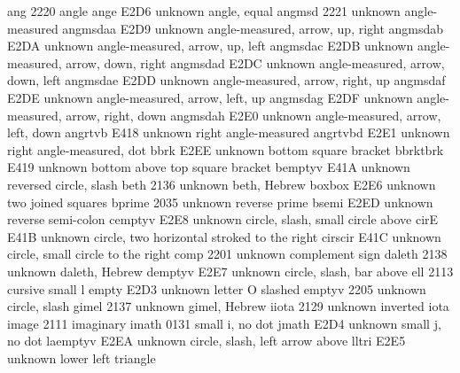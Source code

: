 %
%

 ang            2220 {\angle} angle
 ange           E2D6 {unknown} angle, equal
 angmsd         2221 {unknown} angle-measured
 angmsdaa       E2D9 {unknown} angle-measured, arrow, up, right
 angmsdab       E2DA {unknown} angle-measured, arrow, up, left
 angmsdac       E2DB {unknown} angle-measured, arrow, down, right
 angmsdad       E2DC {unknown} angle-measured, arrow, down, left
 angmsdae       E2DD {unknown} angle-measured, arrow, right, up
 angmsdaf       E2DE {unknown} angle-measured, arrow, left, up
 angmsdag       E2DF {unknown} angle-measured, arrow, right, down
 angmsdah       E2E0 {unknown} angle-measured, arrow, left, down
 angrtvb        E418 {unknown} right angle-measured
 angrtvbd       E2E1 {unknown} right angle-measured, dot
 bbrk           E2EE {unknown} bottom square bracket
 bbrktbrk       E419 {unknown} bottom above top square bracket
 bemptyv        E41A {unknown} reversed circle, slash
 beth           2136 {unknown} beth, Hebrew
 boxbox         E2E6 {unknown} two joined squares
 bprime         2035 {unknown} reverse prime
 bsemi          E2ED {unknown} reverse semi-colon
 cemptyv        E2E8 {unknown} circle, slash, small circle above
 cirE           E41B {unknown} circle, two horizontal stroked to the right
 cirscir        E41C {unknown} circle, small circle to the right
 comp           2201 {unknown} complement sign
 daleth         2138 {unknown} daleth, Hebrew
 demptyv        E2E7 {unknown} circle, slash, bar above
 ell            2113 {\ell} cursive small l
 empty          E2D3 {unknown} letter O slashed
 emptyv         2205 {unknown} circle, slash
 gimel          2137 {unknown} gimel, Hebrew
 iiota          2129 {unknown} inverted iota
 image          2111 {\Im} imaginary
 imath          0131 {\imath} small i, no dot
 jmath          E2D4 {unknown} small j, no dot
 laemptyv       E2EA {unknown} circle, slash, left arrow above
 lltri          E2E5 {unknown} lower left triangle
